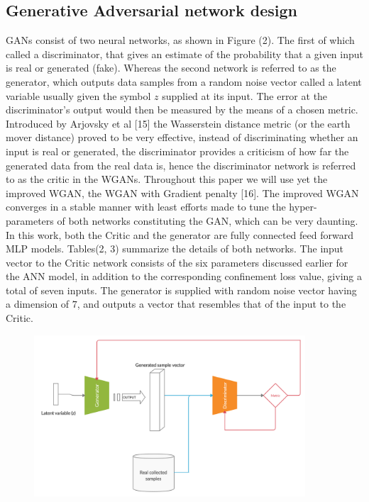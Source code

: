 \documentclass[draft, a4, 10pt, onecolumn]{IEEEtran}
\begin{document}
\subsection{Generative Adversarial network design}
\label{ssec:gan}

GANs consist of two neural networks, as shown in Figure (2). The first of which called a discriminator, that gives an estimate of the probability that a given input is real or generated (fake). Whereas the second network is referred to as the generator, which outputs data samples from a random noise vector called a latent variable usually given the symbol $z$ supplied at its input. The error at the discriminator's output would then be measured by the means of a chosen metric. Introduced by Arjovsky et al [15] the Wasserstein distance metric (or the earth mover distance) proved to be very effective, instead of discriminating whether an input is real or generated, the discriminator provides a criticism of how far the generated data from the real data is, hence the discriminator network is referred to as the critic in the WGANs. Throughout this paper we will use yet the improved WGAN, the WGAN with Gradient penalty [16]. The improved WGAN converges in a stable manner with least efforts made to tune the hyper- parameters of both networks constituting the GAN, which can be very daunting.
In this work, both the Critic and the generator are fully connected feed forward MLP models. Tables(2, 3) summarize the details of both networks. The input vector to the Critic network consists of the six parameters discussed earlier for the ANN model, in addition to the corresponding confinement loss value, giving a total of seven inputs. The generator is supplied with random noise vector having a dimension of $7$, and outputs a vector that resembles that of the input to the Critic.

\begin{figure}
\centering
\includegraphics[trim= 0 0 0 0, clip, width=0.9\textwidth]{GAN.png}
\caption{}
\end{figure}
\end{document}
